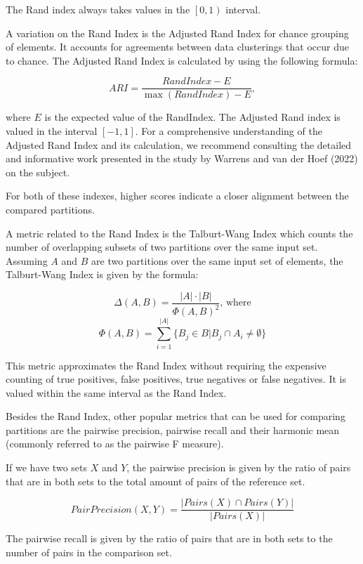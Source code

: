 \documentclass[11pt]{article}
\begin{document}
    The Rand index always takes values in the $\left[0, 1\right)$ interval.

    A variation on the Rand Index is the Adjusted Rand Index for chance grouping
    of elements.
    It accounts for agreements between data clusterings that occur due to
    chance\cite{adjrand2001}.
    The Adjusted Rand Index is calculated by using the following formula:
    
    \[ ARI = \frac{RandIndex - E}{\max(RandIndex) - E}, \]

    where $E$ is the expected value of the RandIndex.
    The Adjusted Rand index is valued in the interval $\left[-1, 1\right]$.
    For a comprehensive understanding of the Adjusted Rand Index and its
    calculation, we recommend consulting the detailed and informative work
    presented in the study by Warrens and van der Hoef (2022) on the
    subject\cite{warrens2022understanding}.

    For both of these indexes, higher scores indicate a closer alignment between
    the compared partitions.

    A metric related to the Rand Index is the Talburt-Wang Index which counts
    the number of overlapping subsets of two partitions over the same input set.
    Assuming $A$ and $B$ are two partitions over the same input set of elements,
    the Talburt-Wang Index is given by the formula:

    \[ \varDelta(A, B) = \frac{|A|\cdot|B|}{\varPhi{\left(A, B\right)}^2}\textrm{, where}\]
    \[ \varPhi(A, B) = \sum_{i=1}^{|A|}\{B_j \in B | B_j \cap A_i \neq \emptyset \} \]

    This metric approximates the Rand Index without requiring the expensive
    counting of true positives, false positives, true negatives or false
    negatives\cite{tal2007algebraic}.
    It is valued within the same interval as the Rand Index.
    
    Besides the Rand Index, other popular metrics that can be used for comparing
    partitions are the pairwise precision, pairwise recall and their harmonic
    mean (commonly referred to as the pairwise F measure)\cite{hitesh2012}.
    
    If we have two sets $X$ and $Y$, the pairwise precision is given by the
    ratio of pairs that are in both sets to the total amount of pairs of the
    reference set.

    \[ Pair Precision(X, Y) = \frac{|{Pairs(X)}\cap{Pairs(Y)}|}{|Pairs(X)|} \]
    
    The pairwise recall is given by the ratio of pairs that are in both sets
    to the number of pairs in the comparison set\cite{hitesh2012}.
\end{document}
